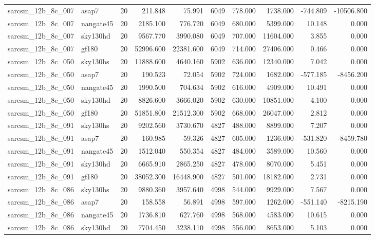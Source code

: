 \documentclass{article}
\begin{document}
\begin{longtable}{llrrrrrrrr}
sarcsm\_12b\_8c\_007 & asap7 & 20 & 211.848 & 75.991 & 6049 & 778.000 & 1738.000 & -744.809 & -10506.800 \\
sarcsm\_12b\_8c\_007 & nangate45 & 20 & 2185.100 & 776.720 & 6049 & 680.000 & 5399.000 & 10.148 & 0.000 \\
sarcsm\_12b\_8c\_007 & sky130hd & 20 & 9567.770 & 3990.080 & 6049 & 707.000 & 11604.000 & 3.855 & 0.000 \\
sarcsm\_12b\_8c\_007 & gf180 & 20 & 52996.600 & 22381.600 & 6049 & 714.000 & 27406.000 & 0.466 & 0.000 \\
sarcsm\_12b\_8c\_050 & sky130hs & 20 & 11888.600 & 4640.160 & 5902 & 636.000 & 12340.000 & 7.042 & 0.000 \\
sarcsm\_12b\_8c\_050 & asap7 & 20 & 190.523 & 72.054 & 5902 & 724.000 & 1682.000 & -577.185 & -8456.200 \\
sarcsm\_12b\_8c\_050 & nangate45 & 20 & 1990.500 & 704.634 & 5902 & 616.000 & 4909.000 & 10.491 & 0.000 \\
sarcsm\_12b\_8c\_050 & sky130hd & 20 & 8826.600 & 3666.020 & 5902 & 630.000 & 10851.000 & 4.100 & 0.000 \\
sarcsm\_12b\_8c\_050 & gf180 & 20 & 51851.800 & 21512.300 & 5902 & 668.000 & 26047.000 & 2.812 & 0.000 \\
sarcsm\_12b\_8c\_091 & sky130hs & 20 & 9202.560 & 3730.670 & 4827 & 488.000 & 8899.000 & 7.207 & 0.000 \\
sarcsm\_12b\_8c\_091 & asap7 & 20 & 160.985 & 59.326 & 4827 & 605.000 & 1236.000 & -531.820 & -8459.780 \\
sarcsm\_12b\_8c\_091 & nangate45 & 20 & 1512.040 & 550.354 & 4827 & 484.000 & 3589.000 & 10.560 & 0.000 \\
sarcsm\_12b\_8c\_091 & sky130hd & 20 & 6665.910 & 2865.250 & 4827 & 478.000 & 8070.000 & 5.451 & 0.000 \\
sarcsm\_12b\_8c\_091 & gf180 & 20 & 38052.300 & 16448.900 & 4827 & 501.000 & 18182.000 & 2.731 & 0.000 \\
sarcsm\_12b\_8c\_086 & sky130hs & 20 & 9880.360 & 3957.640 & 4998 & 544.000 & 9929.000 & 7.567 & 0.000 \\
sarcsm\_12b\_8c\_086 & asap7 & 20 & 158.558 & 56.891 & 4998 & 597.000 & 1262.000 & -551.140 & -8215.190 \\
sarcsm\_12b\_8c\_086 & nangate45 & 20 & 1736.810 & 627.760 & 4998 & 568.000 & 4583.000 & 10.615 & 0.000 \\
sarcsm\_12b\_8c\_086 & sky130hd & 20 & 7704.450 & 3238.110 & 4998 & 556.000 & 8653.000 & 5.103 & 0.000 \\

\end{longtable}
\end{document}
